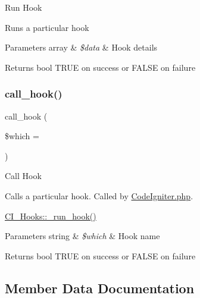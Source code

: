 Run Hook

Runs a particular hook


\begin{DoxyParams}[1]{Parameters}
array & {\em \$data} & Hook details \\
\hline
\end{DoxyParams}
\begin{DoxyReturn}{Returns}
bool T\+R\+UE on success or F\+A\+L\+SE on failure 
\end{DoxyReturn}
\mbox{\label{class_c_i___hooks_a470d397aaf24f1ca3ef73021ad03492b}} 
\subsubsection{\texorpdfstring{call\+\_\+hook()}{call\_hook()}}
{\footnotesize\ttfamily call\+\_\+hook (\begin{DoxyParamCaption}\item[{}]{\$which = {\ttfamily \textquotesingle{}\textquotesingle{}} }\end{DoxyParamCaption})}

Call Hook

Calls a particular hook. Called by \mbox{\hyperlink{_code_igniter_8php}{Code\+Igniter.\+php}}.

\mbox{\hyperlink{class_c_i___hooks_a2cd07b3fcfaf153a37f164d3fbc7c3d9}{C\+I\+\_\+\+Hooks\+::\+\_\+run\+\_\+hook()}}


\begin{DoxyParams}[1]{Parameters}
string & {\em \$which} & Hook name \\
\hline
\end{DoxyParams}
\begin{DoxyReturn}{Returns}
bool T\+R\+UE on success or F\+A\+L\+SE on failure 
\end{DoxyReturn}


\subsection{Member Data Documentation}
\mbox{\label{class_c_i___hooks_a6e8d0edcf7a4fb3e76c0f6d00e70053e}} 
